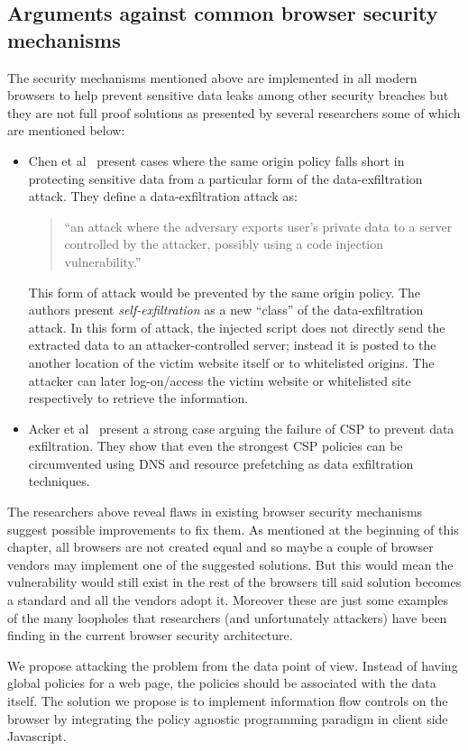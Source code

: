 \subsection{Arguments against common browser security mechanisms \label{sec:against}}
The security mechanisms mentioned above are implemented in all modern browsers to
help prevent sensitive data leaks among other security breaches but they are not
full proof solutions as presented by several researchers some of which are mentioned
below:
\begin{itemize}
  \item Chen et al~\cite{SelfExfil} present cases where the same origin policy falls short
  in protecting sensitive data from a particular form of the data-exfiltration attack.
  They define a data-exfiltration attack as:

  \begin{quotation}
    ``an attack where the adversary exports user's private data to a server controlled
    by the attacker, possibly using a code injection vulnerability.''
  \end{quotation}
  This form of attack would be prevented by the same origin policy. The authors present
  \textit{self-exfiltration} as a new ``class'' of the data-exfiltration attack. In
  this form of attack, the injected script does not directly send the extracted data
  to an attacker-controlled server; instead it is posted to the another location
  of the victim website itself or to whitelisted origins. The attacker can later
  log-on/access the victim website or whitelisted site respectively to retrieve the
  information.

  \item Acker et al~\cite{DataExfilCSP} present a strong case arguing the failure of
  CSP to prevent data exfiltration. They show that even the strongest CSP policies
  can be circumvented using DNS and resource prefetching as data exfiltration
  techniques.
\end{itemize}

The researchers above reveal flaws in existing browser security mechanisms suggest
possible improvements to fix them. As mentioned at the beginning of this chapter,
all browsers are not created equal and so maybe a couple of browser vendors may
implement one of the suggested solutions. But this would mean the vulnerability
would still exist in the rest of the browsers till said solution becomes a standard
and all the vendors adopt it. Moreover these are just some examples of the many
loopholes that researchers (and unfortunately attackers) have been finding in the
current browser security architecture.

We propose attacking the problem from the data point of view. Instead of having
global policies for a web page, the policies should be associated with the data
itself. The solution we propose is to implement information flow controls on the
browser by integrating the policy agnostic programming paradigm in client side Javascript.
